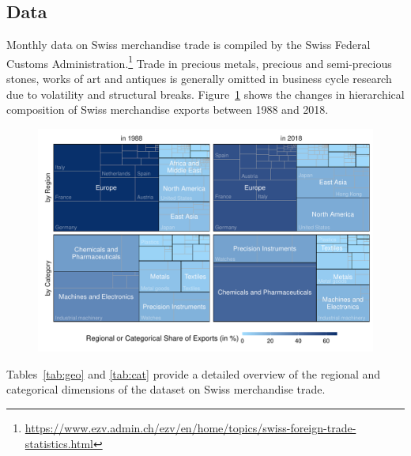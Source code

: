 \subsection{Data}\label{sec:data}

Monthly data on Swiss merchandise trade is compiled by the Swiss Federal Customs Administration.\footnote{\url{https://www.ezv.admin.ch/ezv/en/home/topics/swiss-foreign-trade-statistics.html}} Trade in precious metals, precious and semi-precious stones, works of art and antiques is generally omitted in business cycle research due to volatility and structural breaks.  Figure~\ref{fig:treemap} shows the changes in hierarchical composition of Swiss merchandise exports between 1988 and 2018. 

\begin{figure}[H]
	\includegraphics[width=\textwidth]{fig/fig_treemap}
	\label{fig:treemap}
\end{figure}

Tables~\ref{tab:geo} and \ref{tab:cat} provide a detailed overview of the regional and categorical dimensions of the dataset on Swiss merchandise trade.

